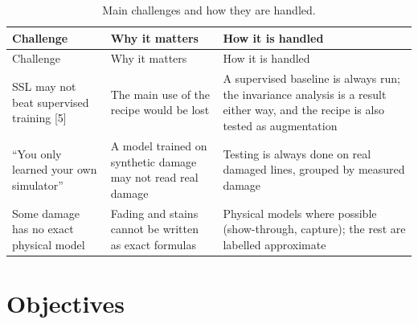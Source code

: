 \documentclass[
  12pt,
  a4paper,
]{report}
\begin{document}
\begin{longtable}[]{@{}
  >{\raggedright\arraybackslash}p{}
  >{\raggedright\arraybackslash}p{}
  >{\raggedright\arraybackslash}p{}@{}}
\caption{Main challenges and how they are handled.}\tabularnewline
\toprule\noalign{}
\begin{minipage}[b]{\linewidth}\raggedright
Challenge
\end{minipage} & \begin{minipage}[b]{\linewidth}\raggedright
Why it matters
\end{minipage} & \begin{minipage}[b]{\linewidth}\raggedright
How it is handled
\end{minipage} \\
\midrule\noalign{}
\endfirsthead
\toprule\noalign{}
\begin{minipage}[b]{\linewidth}\raggedright
Challenge
\end{minipage} & \begin{minipage}[b]{\linewidth}\raggedright
Why it matters
\end{minipage} & \begin{minipage}[b]{\linewidth}\raggedright
How it is handled
\end{minipage} \\
\midrule\noalign{}
\endhead
\bottomrule\noalign{}
\endlastfoot
SSL may not beat supervised training {[}5{]} & The main use of the
recipe would be lost & A supervised baseline is always run; the
invariance analysis is a result either way, and the recipe is also
tested as augmentation \\
``You only learned your own simulator'' & A model trained on synthetic
damage may not read real damage & Testing is always done on real damaged
lines, grouped by measured damage \\
Some damage has no exact physical model & Fading and stains cannot be
written as exact formulas & Physical models where possible
(show-through, capture); the rest are labelled approximate \\
\end{longtable}

\section{Objectives}\label{objectives}
\end{document}
